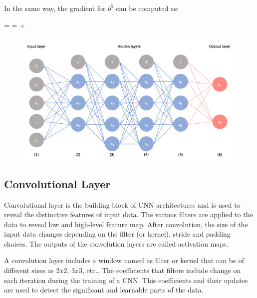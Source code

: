 In the same way, the gradient for $b^{5}$ can be computed as:

\be
\label{eq:compute_specific_bias}
 =  \times {} =  \times {} +  \times {}\:
\ee

\begin{figure}[h]
	\centering
	\includegraphics[width=.8\linewidth]{fig/basic_cnn_sample.png}
	\vspace*{1mm}
	\label{basic_cnn_sample}
\end{figure}

\subsection{Convolutional Layer}

Convolutional layer is the building block of CNN architectures and is used to reveal the distinctive features of input data. The various filters are applied to the data to reveal low and high-level feature map. After convolution, the size of the input data changes depending on the filter (or kernel), stride and padding choices. The outputs of the convolution layers are called activation maps.

A convolution layer includes a window named as filter or kernel that can be of different sizes as $2x2$, $3x3$, etc.. The coefficients that filters include change on each iteration during the training of a CNN. This coefficients and their updates are used to detect the significant and learnable parts of the data.


